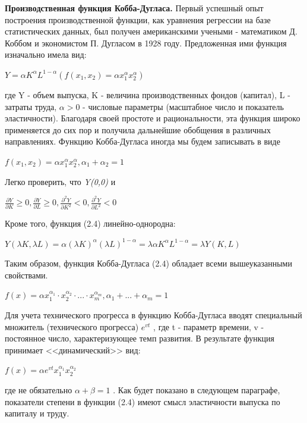 \documentclass[12pt, 4paper]{book}
\begin{document}
{\textbf{Производственная функция Кобба-Дугласа.} Первый успешный опыт построения производственной функции, как уравнения регрессии на базе статистических данных, был получен американскими учеными - математиком Д. Коббом и экономистом П. Дугласом в 1928 году. Предложенная ими функция изначально имела вид: 
\begin{center}
$Y=\alpha K^{\alpha} L^{1- \alpha} (f(x_1,x_2)=\alpha x_{1}^{\alpha} x_{2}^{\alpha})$
\end{center}
где Y - объем выпуска, K - величина производственных фондов (капитал), L - затраты труда, $\alpha >0$ - числовые параметры (масштабное число и показатель эластичности). Благодаря своей простоте и рациональности, эта функция широко применяется до сих пор и получила дальнейшие обобщения в различных направлениях. Функцию Кобба-Дугласа иногда мы будем записывать в виде 
\begin{center}
$f(x_1,x_2) = \alpha x_{1}^{\alpha} x_{2}^{\alpha}, \alpha_1 + \alpha_2 = 1$
\end{center}
\par

Легко проверить, что \textit{Y(0,0)} и 
\begin{center}
$\frac{\partial Y}{\partial K} \geq 0, \frac{\partial Y}{\partial L} \geq 0, \frac{\partial^{2} Y}{\partial K^{2}} < 0, \frac{\partial^{2} Y}{\partial L^2} <0$
\end{center}
\par

Кроме того, функция (2.4) линейно-однородна: 
\begin{center}
$Y(\lambda K, \lambda L)=\alpha (\lambda K)^{\alpha}(\lambda L)^{1 - \alpha} = \lambda \alpha K^{\alpha} L^{1- \alpha}= \lambda Y(K,L)$
\end{center}
\par

Таким образом, функция Кобба-Дугласа (2.4) обладает всеми вышеуказанными свойствами. 
\par

\begin{center}
$f(x)= \alpha x_{1}^{\alpha _1}\cdot x_{2}^{\alpha _2} \cdot ... \cdot x_{m}^{\alpha _m}, \alpha_1+...+ \alpha_m = 1$
\end{center}
\par

Для учета технического прогресса в функцию Кобба-Дугласа вводят специальный множитель (технического прогресса) $e^{vt}$ , где t - параметр времени, v - постоянное число, характеризующее темп развития. В результате функция принимает <<динамический>> вид: 
\begin{center}
$f(x)=\alpha e^{vt}x_{1}^{\alpha_1}x_{2}^{\alpha_2}$
\end{center}
где не обязательно $\alpha + \beta =1$ . Как будет показано в следующем параграфе, показатели степени в функции (2.4) имеют смысл эластичности выпуска по капиталу и труду. 
\par

}
\end{document}
